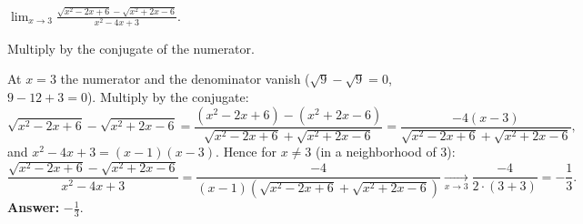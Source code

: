 
\begin{question}
$\displaystyle\lim_{x\to3}\frac{\sqrt{x^2-2x+6}-\sqrt{x^2+2x-6}}{x^2-4x+3}$.
\end{question}

\begin{hint}
Multiply by the conjugate of the numerator.
\end{hint}

\begin{solution}
At $x=3$ the numerator and the denominator vanish ($\sqrt9-\sqrt9=0$, $9-12+3=0$). Multiply by the conjugate:
\[
\sqrt{x^2-2x+6}-\sqrt{x^2+2x-6}=\frac{(x^2-2x+6)-(x^2+2x-6)}{\sqrt{x^2-2x+6}+\sqrt{x^2+2x-6}}=\frac{-4(x-3)}{\sqrt{x^2-2x+6}+\sqrt{x^2+2x-6}},
\]
and $x^2-4x+3=(x-1)(x-3)$. Hence for $x\neq3$ (in a neighborhood of $3$):
\[
\frac{\sqrt{x^2-2x+6}-\sqrt{x^2+2x-6}}{x^2-4x+3}=\frac{-4}{(x-1)\left(\sqrt{x^2-2x+6}+\sqrt{x^2+2x-6}\right)}\xrightarrow[x\to3]{}\frac{-4}{2\cdot(3+3)}=-\frac13.
\]
\textbf{Answer:} $-\frac13$.
\end{solution}
